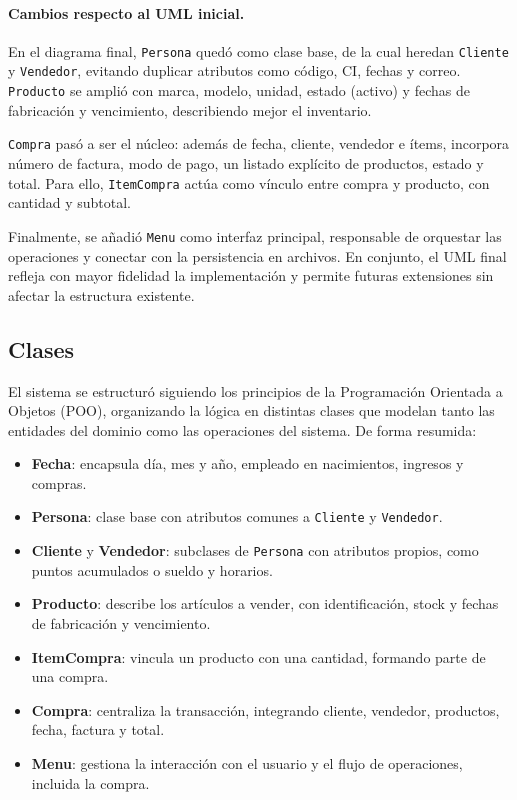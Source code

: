 \documentclass[11pt]{article}
\begin{document}
\paragraph{Cambios respecto al UML inicial.}
En el diagrama final, \texttt{Persona} quedó como clase base, de la cual heredan \texttt{Cliente} y \texttt{Vendedor}, evitando duplicar atributos como código, CI, fechas y correo. 
\texttt{Producto} se amplió con marca, modelo, unidad, estado (activo) y fechas de fabricación y vencimiento, describiendo mejor el inventario.  

\texttt{Compra} pasó a ser el núcleo: además de fecha, cliente, vendedor e ítems, incorpora número de factura, modo de pago, un listado explícito de productos, estado y total. 
Para ello, \texttt{ItemCompra} actúa como vínculo entre compra y producto, con cantidad y subtotal.  

Finalmente, se añadió \texttt{Menu} como interfaz principal, responsable de orquestar las operaciones y conectar con la persistencia en archivos. 
En conjunto, el UML final refleja con mayor fidelidad la implementación y permite futuras extensiones sin afectar la estructura existente.



\subsection{Clases}

El sistema se estructuró siguiendo los principios de la Programación Orientada a Objetos (POO), organizando la lógica en distintas clases que modelan tanto las entidades del dominio como las operaciones del sistema.  
De forma resumida:

\begin{itemize}
    \item \textbf{Fecha}: encapsula día, mes y año, empleado en nacimientos, ingresos y compras.  
    \item \textbf{Persona}: clase base con atributos comunes a \texttt{Cliente} y \texttt{Vendedor}.  
    \item \textbf{Cliente} y \textbf{Vendedor}: subclases de \texttt{Persona} con atributos propios, como puntos acumulados o sueldo y horarios.  
    \item \textbf{Producto}: describe los artículos a vender, con identificación, stock y fechas de fabricación y vencimiento.  
    \item \textbf{ItemCompra}: vincula un producto con una cantidad, formando parte de una compra.  
    \item \textbf{Compra}: centraliza la transacción, integrando cliente, vendedor, productos, fecha, factura y total.  
    \item \textbf{Menu}: gestiona la interacción con el usuario y el flujo de operaciones, incluida la compra.
\end{itemize}
\end{document}

